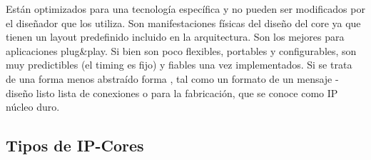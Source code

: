 Están optimizados para una tecnología específica y no pueden ser modificados por el diseñador que los utiliza. Son manifestaciones físicas del diseño del core ya que tienen un layout predefinido incluido en la arquitectura. Son los mejores para aplicaciones plug\&play. Si bien son poco flexibles, portables y configurables, son muy predictibles (el timing es fijo) y fiables una vez implementados.
Si se trata de una forma menos abstraído forma , tal como un formato de un mensaje - diseño listo lista de conexiones o para la fabricación, que se conoce como
IP núcleo duro. \cite{Etiqueta04}

		\subsection{Tipos de IP-Cores}

		
